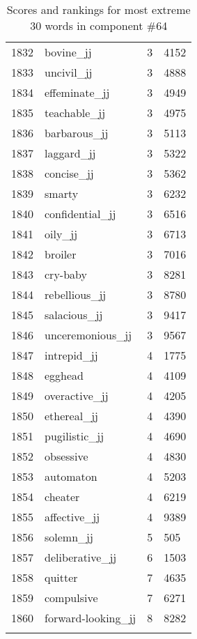 \begin{longtable}[!htbp]{| rlr@{.}l |}
    1832 & bovine\_jj & 3 & 4152 \\
    1833 & uncivil\_jj & 3 & 4888 \\
    1834 & effeminate\_jj & 3 & 4949 \\
    1835 & teachable\_jj & 3 & 4975 \\
    1836 & barbarous\_jj & 3 & 5113 \\
    1837 & laggard\_jj & 3 & 5322 \\
    1838 & concise\_jj & 3 & 5362 \\
    1839 & smarty & 3 & 6232 \\
    1840 & confidential\_jj & 3 & 6516 \\
    1841 & oily\_jj & 3 & 6713 \\
    1842 & broiler & 3 & 7016 \\
    1843 & cry-baby & 3 & 8281 \\
    1844 & rebellious\_jj & 3 & 8780 \\
    1845 & salacious\_jj & 3 & 9417 \\
    1846 & unceremonious\_jj & 3 & 9567 \\
    1847 & intrepid\_jj & 4 & 1775 \\
    1848 & egghead & 4 & 4109 \\
    1849 & overactive\_jj & 4 & 4205 \\
    1850 & ethereal\_jj & 4 & 4390 \\
    1851 & pugilistic\_jj & 4 & 4690 \\
    1852 & obsessive & 4 & 4830 \\
    1853 & automaton & 4 & 5203 \\
    1854 & cheater & 4 & 6219 \\
    1855 & affective\_jj & 4 & 9389 \\
    1856 & solemn\_jj & 5 & 505 \\
    1857 & deliberative\_jj & 6 & 1503 \\
    1858 & quitter & 7 & 4635 \\
    1859 & compulsive & 7 & 6271 \\
    1860 & forward-looking\_jj & 8 & 8282 \\
    \hline
    \caption{Scores and rankings for most extreme 30 words in component \#64} \\
\end{longtable}
